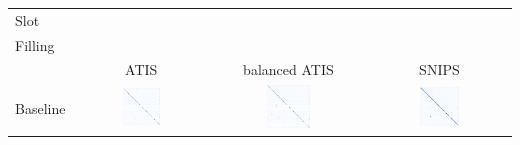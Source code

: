 \documentclass[a4paper]{article}
\begin{document}
\begin{table}[h!]
	\centering
	\begin{adjustbox}{max width=\textwidth}
		\begin{tabular}{l|ccc}
			Slot & & & \\
			Filling & & & \\
			& ATIS & balanced ATIS & SNIPS \\
			\cmidrule{1-4}
			Baseline &  \includegraphics[width=0.3\textwidth]{"../assets/images/confusion matrixes/CM_baseline_slot_ATIS_labeless"} & \includegraphics[width=0.3\textwidth]{"../assets/images/confusion matrixes/CM_baseline_slot_remix_ATIS_labeless"} &\includegraphics[width=0.3\textwidth]{"../assets/images/confusion matrixes/CM_baseline_slot_SNIPS_labeless"} \\
			\cmidrule{1-4}

\end{tabular}
\end{adjustbox}
\end{table}
\end{document}
